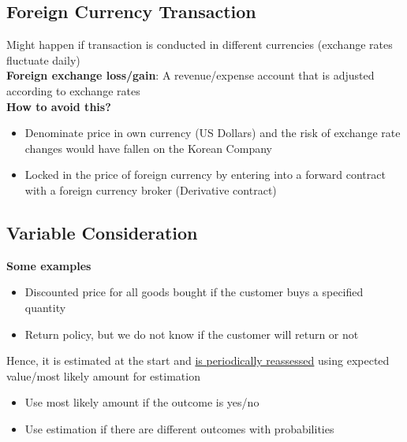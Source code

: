 \documentclass{article}
\begin{document}
\begin{multicols}{2}
\subsection{Foreign Currency Transaction}
Might happen if transaction is conducted in different currencies (exchange rates fluctuate daily)\\
\textbf{Foreign exchange loss/gain}: A revenue/expense account that is adjusted according to exchange rates\\
\textbf{How to avoid this?}
\begin{itemize}
	\item Denominate price in own currency (US Dollars) and the risk of exchange rate changes would have fallen on the Korean Company
	\item Locked in the price of foreign currency by entering into a forward contract with a foreign currency broker (Derivative contract)
\end{itemize}
\subsection{Variable Consideration}
\textbf{Some examples}
\begin{itemize}
	\item Discounted price for all goods bought if the customer buys a specified quantity
	\item Return policy, but we do not know if the customer will return or not
\end{itemize}
Hence, it is estimated at the start and \underline{is periodically reassessed} using expected value/most likely amount for estimation
\begin{itemize}
	\item Use most likely amount if the outcome is yes/no
	\item Use estimation if there are different outcomes with probabilities
\end{itemize}

\end{multicols}
\end{document}
